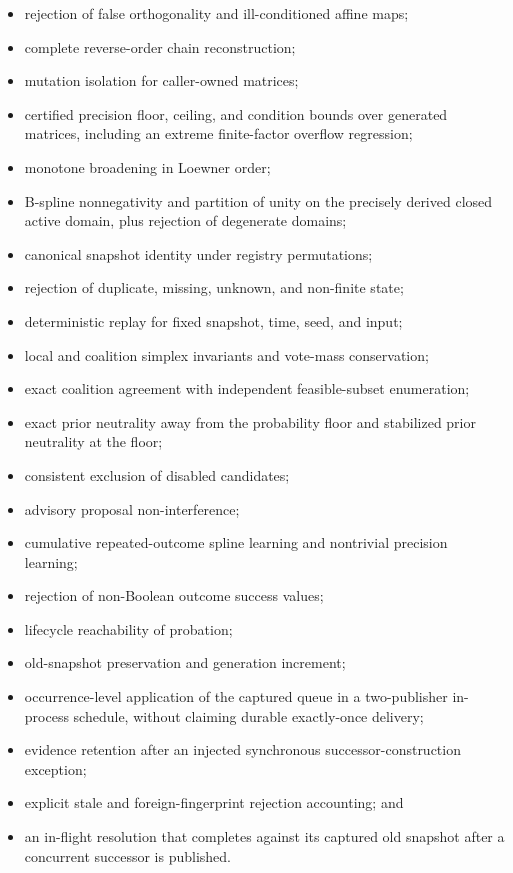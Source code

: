 \documentclass[11pt]{article}
\theoremstyle{definition}
\theoremstyle{plain}
\begin{document}
\begin{itemize}[leftmargin=*,itemsep=1pt]
  \item rejection of false orthogonality and ill-conditioned affine maps;
  \item complete reverse-order chain reconstruction;
  \item mutation isolation for caller-owned matrices;
  \item certified precision floor, ceiling, and condition bounds over generated
  matrices, including an extreme finite-factor overflow regression;
  \item monotone broadening in Loewner order;
  \item B-spline nonnegativity and partition of unity on the precisely derived
  closed active domain, plus rejection of degenerate domains;
  \item canonical snapshot identity under registry permutations;
  \item rejection of duplicate, missing, unknown, and non-finite state;
  \item deterministic replay for fixed snapshot, time, seed, and input;
  \item local and coalition simplex invariants and vote-mass conservation;
  \item exact coalition agreement with independent feasible-subset
  enumeration;
  \item exact prior neutrality away from the probability floor and stabilized
  prior neutrality at the floor;
  \item consistent exclusion of disabled candidates;
  \item advisory proposal non-interference;
  \item cumulative repeated-outcome spline learning and nontrivial precision
  learning;
  \item rejection of non-Boolean outcome success values;
  \item lifecycle reachability of probation;
  \item old-snapshot preservation and generation increment;
  \item occurrence-level application of the captured queue in a two-publisher
  in-process schedule, without claiming durable exactly-once delivery;
  \item evidence retention after an injected synchronous
  successor-construction exception;
  \item explicit stale and foreign-fingerprint rejection accounting; and
  \item an in-flight resolution that completes against its captured old
  snapshot after a concurrent successor is published.
\end{itemize}
\end{document}
